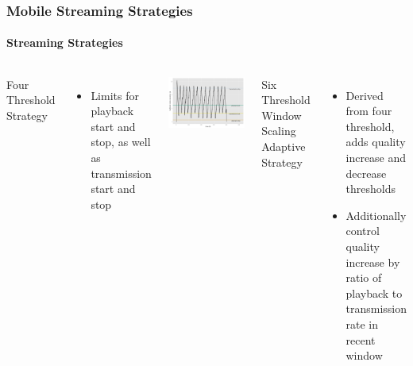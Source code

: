 \documentclass{beamer}
\begin{document}
\begin{frame}
	\frametitle{Mobile Streaming Strategies}
	\framesubtitle{Streaming Strategies}

	\begin{columns}[T]
			Four Threshold Strategy

			\begin{itemize}
				\item Limits for playback start and stop, as well as transmission start and stop
			\end{itemize}


		\includegraphics[width=\columnwidth]{../../chapters/06-mobilestreamingmeasurements/images/R-ltesim-plotbuffer-time.pdf}

		Six Threshold Window Scaling Adaptive Strategy

		\begin{itemize}
			\item Derived from four threshold, adds quality increase and decrease thresholds
			\item Additionally control quality increase by ratio of playback to transmission rate in recent window 
		\end{itemize}

	\end{columns}

\end{frame}


	
\end{document}
